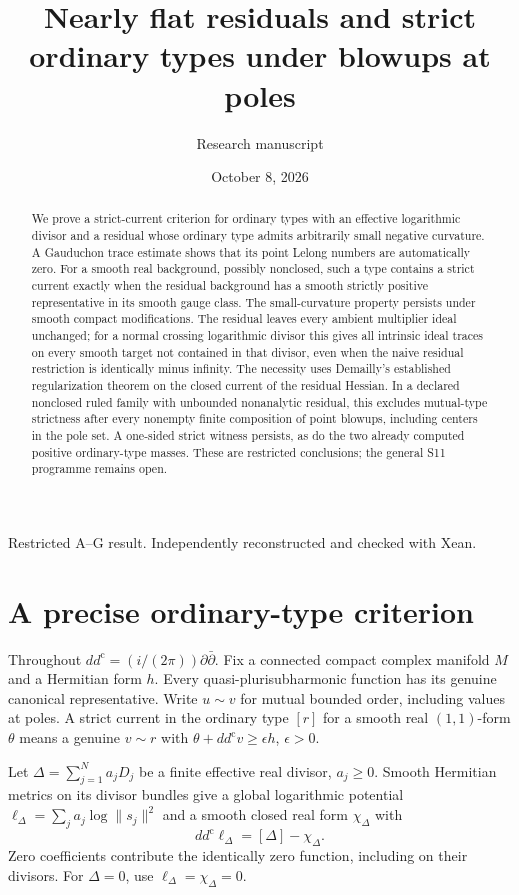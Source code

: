 \documentclass[11pt]{article}
\title{Nearly flat residuals and strict ordinary types\newline
under blowups at poles}
\author{Research manuscript}
\date{October 8, 2026}
\theoremstyle{remark}
\newcommand{\ddc}{dd^{\mathrm c}}
\begin{document}
\maketitle
\begin{center}
\small Restricted A--G result. Independently reconstructed and checked with Xean.
\end{center}
\begin{abstract}
We prove a strict-current criterion for ordinary types with an effective
logarithmic divisor and a residual whose ordinary type admits arbitrarily
small negative curvature. A Gauduchon trace estimate shows that its point
Lelong numbers are automatically zero. For a smooth real background, possibly nonclosed,
such a type contains a strict current exactly when the residual background
has a smooth strictly positive representative in its smooth gauge class.
The small-curvature property persists under smooth compact modifications.
The residual leaves every ambient multiplier ideal unchanged; for a normal
crossing logarithmic divisor this gives all intrinsic ideal traces on
every smooth target not contained in that divisor, even when the naive
residual restriction is identically minus infinity.
The necessity uses Demailly's established regularization theorem on the
closed current of the residual Hessian. In a declared nonclosed ruled
family with unbounded nonanalytic residual, this excludes mutual-type
strictness after every nonempty finite composition of point blowups,
including centers in the pole set. A one-sided strict witness persists,
as do the two already computed positive ordinary-type masses. These are
restricted conclusions; the general S11 programme remains open.
\end{abstract}

\section{A precise ordinary-type criterion}
Throughout $\ddc=(i/(2\pi))\partial\bar\partial$. Fix a connected compact
complex manifold $M$ and a Hermitian form $h$. Every quasi-plurisubharmonic
function has its genuine canonical representative. Write $u\sim v$ for
mutual bounded order, including values at poles. A strict current in the
ordinary type $[r]$ for a smooth real $(1,1)$-form $\theta$ means a genuine
$v\sim r$ with $\theta+\ddc v\geq\epsilon h$, $\epsilon>0$.

Let $\Delta=\sum_{j=1}^N a_jD_j$ be a finite effective real divisor,
$a_j\geq0$. Smooth Hermitian metrics on its divisor bundles give a global
logarithmic potential $\ell_\Delta=\sum_j a_j\log\|s_j\|^2$ and a smooth
closed real form $\chi_\Delta$ with
\[
 \ddc\ell_\Delta=[\Delta]-\chi_\Delta.
\]
Zero coefficients contribute the identically zero function, including
on their divisors. For $\Delta=0$, use $\ell_\Delta=\chi_\Delta=0$.
\end{document}
